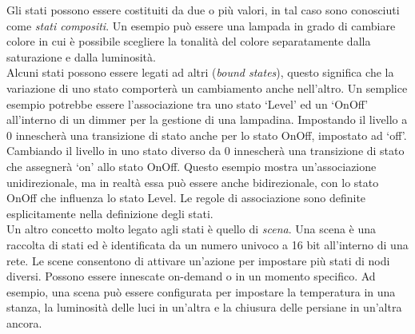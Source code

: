 \noindent Gli stati possono essere costituiti da due o più valori, in tal caso sono conosciuti come \textit{stati compositi}. Un esempio può essere una lampada in grado di cambiare colore in cui è possibile scegliere la tonalità del colore separatamente dalla saturazione e dalla luminosità.\\

\noindent Alcuni stati possono essere legati ad altri (\textit{bound states}), questo significa che la variazione di uno stato comporterà un cambiamento anche nell'altro. Un semplice esempio potrebbe essere l'associazione tra uno stato `Level' ed un `OnOff' all'interno di un dimmer per la gestione di una lampadina. Impostando il livello a 0 innescherà una transizione di stato anche per lo stato OnOff, impostato ad `off'. Cambiando il livello in uno stato diverso da 0 innescherà una transizione di stato che assegnerà `on' allo stato OnOff. Questo esempio mostra un'associazione unidirezionale, ma in realtà essa può essere anche bidirezionale, con lo stato OnOff che influenza lo stato Level. Le regole di associazione sono definite esplicitamente nella definizione degli stati.\\

\noindent Un altro concetto molto legato agli stati è quello di \textit{scena}. Una scena è una raccolta di stati ed è identificata da un numero univoco a 16 bit all'interno di una rete. Le scene consentono di attivare un'azione per impostare più stati di nodi diversi. Possono essere innescate on-demand o in un momento specifico. Ad esempio, una scena può essere configurata per impostare la temperatura in una stanza, la luminosità delle luci in un'altra e la chiusura delle persiane in un'altra ancora.

